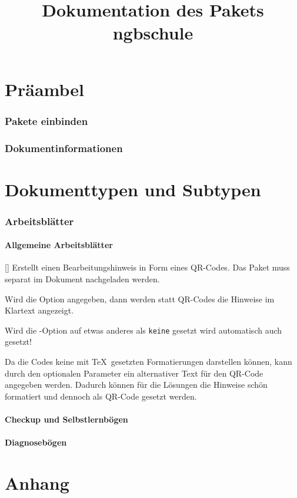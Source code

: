 \documentclass[a4paper,add-index,ngerman]{cnltx-doc}
\title{Dokumentation des Pakets ngbschule}
\begin{document}


\part{Präambel}
\section{Pakete einbinden}
\section{Dokumentinformationen}



\part{Dokumenttypen und Subtypen}
\section{Arbeitsblätter}
\subsection{Allgemeine Arbeitsblätter}
\begin{commands}
	[]
	Erstellt einen Bearbeitungshinweis in Form eines QR-Codes. Das Paket  muss separat im Dokument nachgeladen werden.
	
	Wird die Option  angegeben, dann werden statt QR-Codes die Hinweise im Klartext angezeigt.
	
	Wird die -Option  auf etwas anderes als \texttt{keine} gesetzt wird automatisch auch  gesetzt!
	
	Da die Codes keine mit \TeX\ gesetzten Formatierungen darstellen können, kann durch den optionalen Parameter  ein alternativer Text für den QR-Code angegeben werden. Dadurch können für die Lösungen die Hinweise schön formatiert und dennoch als QR-Code gesetzt werden.
\end{commands}

\subsection{Checkup und Selbstlernbögen}
\subsection{Diagnosebögen}




\part{Anhang}
\end{document}
